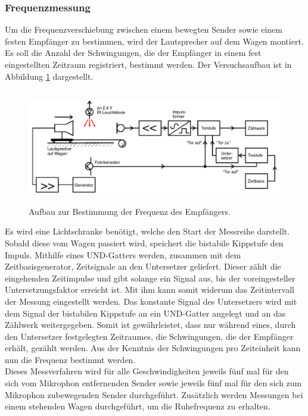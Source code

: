 \subsubsection{Frequenzmessung}
\label{sec:durch_fre}
Um die Frequenzverschiebung zwischen einem bewegten Sender sowie einem festen Empfänger zu bestimmen, wird der Lautsprecher auf dem Wagen montiert.
Es soll die Anzahl der Schwingungen, die der Empfänger in einem fest eingestellten Zeitraum registriert, bestimmt werden.
Der Versuchsaufbau ist in Abbildung \ref{tfig:2} dargestellt.
\begin{figure}
  \centering
  \includegraphics[height=5cm]{aufbau2.png}
  \caption{Aufbau zur Bestimmung der Frequenz des Empfängers.}
  \label{tfig:2}
\end{figure}
Es wird eine Lichtschranke benötigt, welche den Start der Messreihe darstellt.
Sobald diese vom Wagen passiert wird, speichert die bistabile Kippstufe den Impuls.
Mithilfe eines UND-Gatters werden, zusammen mit dem Zeitbasisgenerator, Zeitsignale an den Untersetzer geliefert.
Dieser zählt die eingehenden Zeitimpulse und gibt solange ein Signal aus, bis der voreingesteller Untersetzungsfaktor erreicht ist.
Mit ihm kann somit widerum das Zeitintervall der Messung eingestellt werden.
Das konstante Signal des Untersetzers wird mit dem Signal der bistabilen Kippstufe an ein UND-Gatter angelegt und an das Zählwerk weitergegeben.
Somit ist gewährleistet, dass nur während eines, durch den Untersetzer festgelegten Zeitraumes, die Schwingungen, die der Empfänger erhält, gezählt werden.
Aus der Kenntnis der Schwingungen pro Zeiteinheit kann nun die Frequenz bestimmt werden.\\
Dieses Messverfahren wird für alle Geschwindigkeiten jeweils fünf mal für den sich vom Mikrophon entfernenden Sender sowie jeweils fünf mal für den sich zum Mikrophon zubewegenden Sender durchgeführt.
Zusätzlich werden Messungen bei einem stehenden Wagen durchgeführt, um die Ruhefrequenz zu erhalten.

